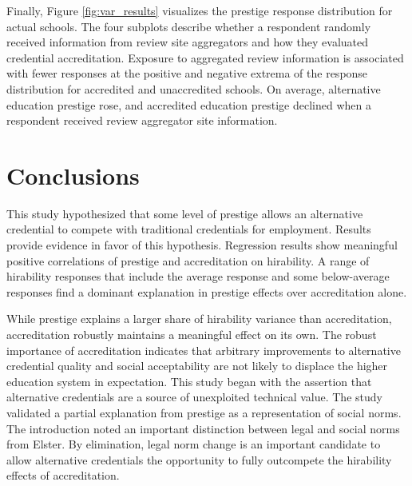 \documentclass[review]{elsarticle}
\begin{document}
Finally, Figure \ref{fig:var_results} visualizes the prestige response distribution
for actual schools.
The four subplots describe whether a respondent randomly received information from review site aggregators
and how they evaluated credential accreditation.
Exposure to aggregated review information is associated with fewer responses at the positive
and negative extrema of the response distribution for accredited and unaccredited schools.
On average, alternative education prestige rose,
and accredited education prestige declined when a respondent received review aggregator site information.

\section{Conclusions}

This study hypothesized that some level of prestige allows an alternative credential to compete with traditional credentials for employment.
Results provide evidence in favor of this hypothesis.
Regression results show meaningful positive correlations of prestige and accreditation on hirability.
A range of hirability responses that include the average response and some below-average responses
find a dominant explanation in prestige effects over accreditation alone.

While prestige explains a larger share of hirability variance than accreditation, accreditation robustly maintains a meaningful effect on its own.
The robust importance of accreditation indicates that arbitrary improvements to alternative credential
quality and social acceptability are not likely to displace the higher education system in expectation.
This study began with the assertion that alternative credentials are a source of unexploited technical value.
The study validated a partial explanation from prestige as a representation of social norms.
The introduction noted an important distinction between legal and social norms from Elster.
By elimination, legal norm change is an important candidate to allow alternative credentials the opportunity
to fully outcompete the hirability effects of accreditation.

\end{document}
